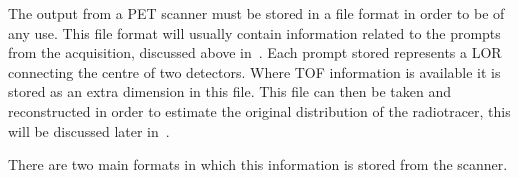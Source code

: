                 The output from a \gls{PET} scanner must be stored in a %
                file format in order to be of any use. %
                This file format will usually contain information related to the prompts from the acquisition, discussed above in~. Each prompt stored represents a \gls{LOR} connecting the centre of two detectors. %
                Where \gls{TOF} information is available it is stored as an extra dimension in this file. This file can then be taken and reconstructed in order to estimate the original distribution of the radiotracer, this will be discussed later in~.
                
                There are two main formats in which this information is stored from the scanner.
                
